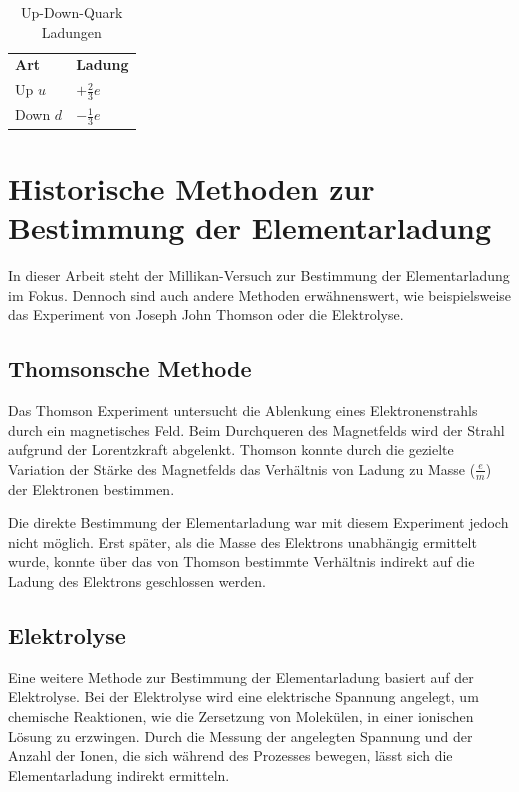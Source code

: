 \begin{table}[ht]
	\centering
	\renewcommand{\arraystretch}{1.5} %
	\begin{tabular}{>{\centering\arraybackslash}m{3cm}|>{\centering\arraybackslash}m{3cm}}
		\multicolumn{2}{c}{\textit{\textbf{Quark Tabelle}}} \\
		\hline
		\textbf{Art} & \textbf{Ladung} \\
		\hline
		Up \( u \) & \( + \frac{2}{3}e \) \\
		Down \( d \) & \( - \frac{1}{3}e \) \\
		\hline
	\end{tabular}
	\caption{Up-Down-Quark Ladungen}
	\label{tab:quark_tabelle}
\end{table}

\section[Historische Methoden]{Historische Methoden zur Bestimmung der Elementarladung}\label{sec:historischeMethoden}
In dieser Arbeit steht der Millikan-Versuch zur Bestimmung der Elementarladung im Fokus. Dennoch sind auch andere Methoden erwähnenswert, wie beispielsweise das Experiment von Joseph John Thomson oder die Elektrolyse.

\subsection{Thomsonsche Methode}\label{sub:thomson}
Das Thomson Experiment untersucht die Ablenkung eines Elektronenstrahls durch ein magnetisches Feld. Beim Durchqueren des Magnetfelds wird der Strahl aufgrund der Lorentzkraft abgelenkt. Thomson konnte durch die gezielte Variation der Stärke des Magnetfelds das Verhältnis von Ladung zu Masse ($\frac{e}{m}$) der Elektronen bestimmen.

Die direkte Bestimmung der Elementarladung war mit diesem Experiment jedoch nicht möglich. Erst später, als die Masse des Elektrons unabhängig ermittelt wurde, konnte über das von Thomson bestimmte Verhältnis indirekt auf die Ladung des Elektrons geschlossen werden.

\subsection{Elektrolyse}\label{sub:elektrolyse}
Eine weitere Methode zur Bestimmung der Elementarladung basiert auf der Elektrolyse. Bei der Elektrolyse wird eine elektrische Spannung angelegt, um chemische Reaktionen, wie die Zersetzung von Molekülen, in einer ionischen Lösung zu erzwingen. Durch die Messung der angelegten Spannung und der Anzahl der Ionen, die sich während des Prozesses bewegen, lässt sich die Elementarladung indirekt ermitteln.

